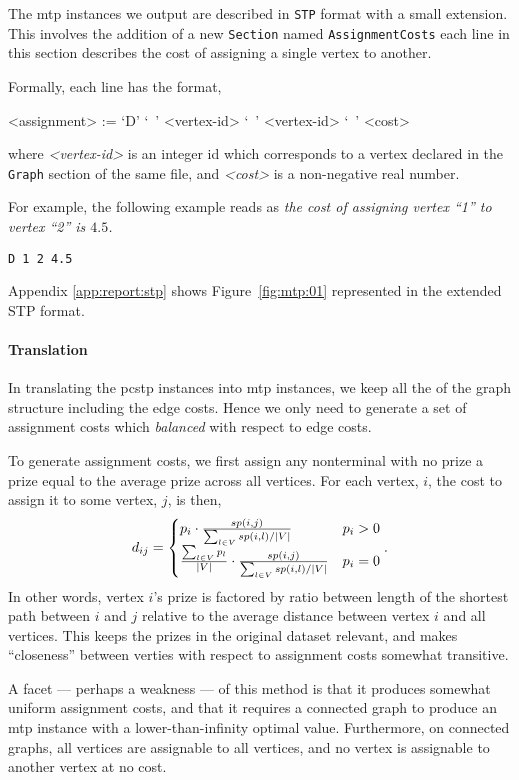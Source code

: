  The \gls{mtp} instances we output are described in \texttt{STP} format with a small extension.
 This involves the addition of a new \texttt{Section} named \texttt{AssignmentCosts} each line
 in this section describes the cost of assigning a single vertex to another.

 Formally, each line has the format,
 \begin{grammar}
   <assignment> := `D' `\ ' <vertex-id> `\ ' <vertex-id> `\ ' <cost>
 \end{grammar}
 where \textit{<vertex-id>} is an integer id which corresponds to a vertex declared in the \texttt{Graph}
 section of the same file, and \textit{<cost>} is a non-negative real number.

 For example, the following example reads as \textit{the cost of assigning vertex ``1'' to vertex ``2'' is $4.5$.}
\begin{verbatim}
D 1 2 4.5
\end{verbatim}
Appendix \ref{app:report:stp} shows Figure~\ref{fig:mtp:01} represented in the extended STP format.
 \paragraph{Translation}
 In translating the \gls{pcstp} instances into \gls{mtp} instances, we keep all the of the graph
 structure including the edge costs. Hence we only need to generate a set of assignment costs which
  \textit{balanced} with respect to edge costs.

 To generate assignment costs, we first assign any nonterminal with no prize a prize
 equal to the average prize across all vertices. For each vertex, $i$, the cost to assign
 it to some vertex, $j$, is then,
 $$d_{ij} =
 \begin{cases}
   p_i \cdot \frac{sp(i, j)}{\sum_{l \in V}sp(i,l) / |V|} & p_i > 0 \\
      \frac{\sum_{l \in V} p_l}{|V|} \cdot \frac{sp(i, j)}{\sum_{l \in V}sp(i,l) / |V|} & p_i = 0
 \end{cases}\mathnormal{.}
$$
 In other words, vertex $i$'s prize is factored by ratio between length of the shortest path
 between $i$ and $j$ relative to the average distance between vertex $i$ and all vertices.
 This keeps the prizes in the original dataset relevant, and makes ``closeness'' between
 verties with respect to assignment costs somewhat transitive.

 A facet --- perhaps a weakness --- of this method is that it produces somewhat uniform
 assignment costs, and that it requires a connected graph to produce an \gls{mtp} instance
 with a lower-than-infinity optimal value. Furthermore, on connected graphs, all vertices
 are assignable to all vertices, and no vertex is assignable to another vertex at no cost.

